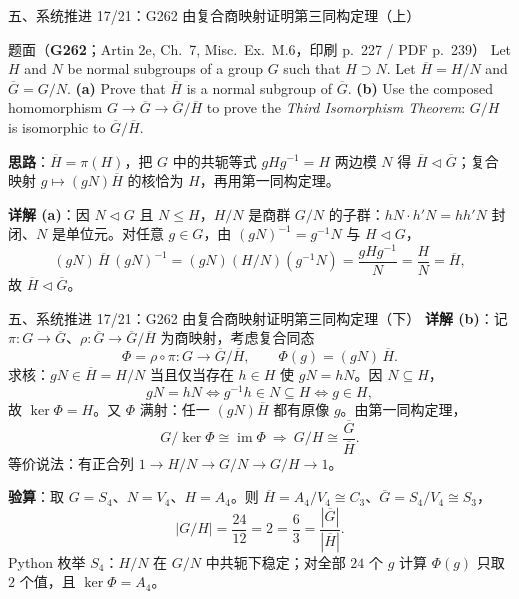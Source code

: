 \documentclass[aspectratio=169,10pt,fontset=none]{ctexbeamer}
\newcommand{\ex}[1]{\textcolor{accent}{\footnotesize\bfseries #1}}
\newcommand{\key}[1]{\textcolor{ink}{\bfseries #1}}
\begin{document}
\begin{frame}[t]{五、系统推进 17/21：G262 由复合商映射证明第三同构定理（上）}
\label{ex:G262}
\scriptsize
\begin{block}{\footnotesize 题面（\ex{G262}；Artin 2e, Ch.~7, Misc.\ Ex.~M.6，印刷 p.~227 / PDF p.~239）}
Let $H$ and $N$ be normal subgroups of a group $G$ such that $H\supset N$. Let $\overline H=H/N$ and $\overline G=G/N$. \textbf{(a)} Prove that $\overline H$ is a normal subgroup of $\overline G$. \textbf{(b)} Use the composed homomorphism $G\to\overline G\to\overline G/\overline H$ to prove the \emph{Third Isomorphism Theorem}: $G/H$ is isomorphic to $\overline G/\overline H$.
\end{block}
\key{思路}：$\overline H=\pi(H)$，把 $G$ 中的共轭等式 $gHg^{-1}=H$ 两边模 $N$ 得 $\overline H\triangleleft\overline G$；复合映射 $g\mapsto(gN)\overline H$ 的核恰为 $H$，再用第一同构定理。

\key{详解 (a)}：因 $N\triangleleft G$ 且 $N\le H$，$H/N$ 是商群 $G/N$ 的子群：$hN\cdot h'N=hh'N$ 封闭、$N$ 是单位元。对任意 $g\in G$，由 $(gN)^{-1}=g^{-1}N$ 与 $H\triangleleft G$，
\[ (gN)\,\overline H\,(gN)^{-1}=(gN)(H/N)(g^{-1}N)=\frac{gHg^{-1}}{N}=\frac{H}{N}=\overline H, \]
故 $\overline H\triangleleft\overline G$。
\end{frame}

\begin{frame}[t]{五、系统推进 17/21：G262 由复合商映射证明第三同构定理（下）}
\scriptsize
\key{详解 (b)}：记 $\pi:G\to\overline G$、$\rho:\overline G\to\overline G/\overline H$ 为商映射，考虑复合同态
\[ \Phi=\rho\circ\pi:G\longrightarrow\overline G/\overline H,\qquad \Phi(g)=(gN)\,\overline H. \]
求核：$gN\in\overline H=H/N$ 当且仅当存在 $h\in H$ 使 $gN=hN$。因 $N\subseteq H$，
\[ gN=hN\iff g^{-1}h\in N\subseteq H\iff g\in H, \]
故 $\ker\Phi=H$。又 $\Phi$ 满射：任一 $(gN)\overline H$ 都有原像 $g$。由第一同构定理，
\[ G/\ker\Phi\cong\operatorname{im}\Phi\ \Longrightarrow\ G/H\cong\frac{\overline G}{\overline H}. \]
等价说法：有正合列 $1\to H/N\to G/N\to G/H\to1$。

\key{验算}：取 $G=S_4$、$N=V_4$、$H=A_4$。则 $\overline H=A_4/V_4\cong C_3$、$\overline G=S_4/V_4\cong S_3$，
\[ |G/H|=\frac{24}{12}=2=\frac{6}{3}=\frac{|\overline G|}{|\overline H|}. \]
Python 枚举 $S_4$：$H/N$ 在 $G/N$ 中共轭下稳定；对全部 $24$ 个 $g$ 计算 $\Phi(g)$ 只取 $2$ 个值，且 $\ker\Phi=A_4$。
\end{frame}
\end{document}
